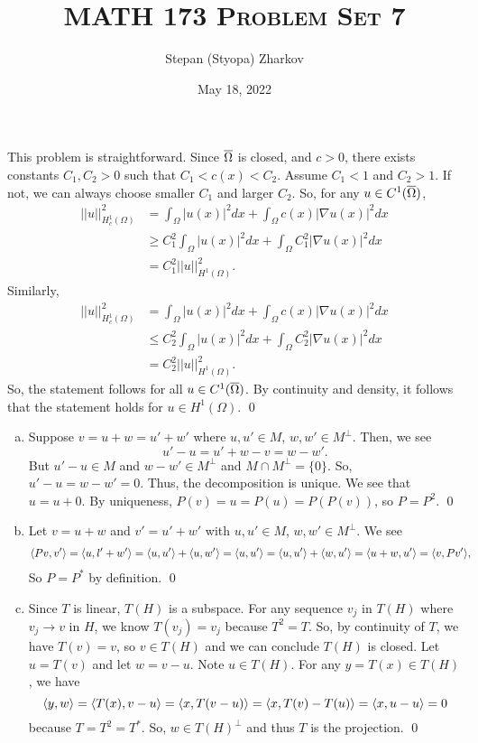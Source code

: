 \documentclass{article}
\title{\textsc{MATH 173 Problem Set 7}}
\author{Stepan (Styopa) Zharkov}
\date{May 18, 2022}
\newcommand{\D}{\nabla}
\begin{document}
\maketitle
{} 
 \tri
\hop 
\solution
This problem is straightforward. Since ${\overline{\Omega}}$ is closed, and $c > 0$, there exists constants $C_1, C_2 >0$ such that $C_1 < c(x) < C_2$. Assume $C_1 < 1$ and $C_2 > 1$. If not, we can always choose smaller $C_1$ and larger $C_2$. So, for any $u \in C^1({\overline{\Omega}})$, 
\begin{align*}
    ||u||^2_{H^1_c(\Omega)} &= \int_\Omega |u(x)|^2 dx + \int_\Omega c(x) |\D u (x)|^2 dx \\
    &\ge C_1^2\int_\Omega |u(x)|^2 dx + \int_\Omega C_1^2|\D u (x)|^2 dx\\
    &= C_1^2||u||^2_{H^1(\Omega)}.
\end{align*}
Similarly, 
\begin{align*}
    ||u||^2_{H^1_c(\Omega)} &= \int_\Omega |u(x)|^2 dx + \int_\Omega c(x) |\D u (x)|^2 dx \\
    &\le C_2^2\int_\Omega |u(x)|^2 dx + \int_\Omega C_2^2|\D u (x)|^2 dx\\
    &= C_2^2||u||^2_{H^1(\Omega)}.
\end{align*}
So, the statement follows for all  $u \in C^1({\overline{\Omega}})$. By continuity and density, it follows that the statement holds for $u \in H^1(\Omega)$. \qed
\newpage
{} 
 \tri
\hop 
\solution
\begin{enumerate}[(a)]
    \item Suppose $v = u+w = u' + w'$ where $u,u' \in M$, $w, w' \in M^\perp$. Then, we see 
    \[u' - u = u'+w - v = w - w'.\]
    But $u'-u \in M$ and $w - w' \in M^\perp$ and $M \cap M^\perp = \{0\}$. So, $u' - u = w-w' = 0$. Thus, the decomposition is unique. 
    \hop 
    We see that $u = u+0$. By uniqueness, $P(v) = u = P(u) = P(P(v))$, so $P = P^2$. \qed
    \item Let $v = u+w$ and $v' = u'+w'$ with $u,u' \in M$, $w, w' \in M^\perp$. We see 
    \begin{align*}
        \langle Pv, v'\rangle  &= \langle u, l'+w'\rangle = \langle u, u'\rangle + \langle u,w'\rangle = \langle u, u'\rangle = \langle u,u'\rangle+\langle w, u'\rangle = \langle u+w, u'\rangle = \langle v, Pv'\rangle,
    \end{align*}
    So $P = P^*$ by definition. \qed 
    \item Since $T$ is linear, $T(H)$ is a subspace. For any sequence $v_j$ in $T(H)$ where $v_j \to v$ in $H$, we know $T(v_j) = v_j$ because $T^2 = T$. So, by continuity of $T$, we have $T(v) = v$, so $v \in T(H)$ and we can conclude $T(H)$ is closed. 
    \hop 
    Let $u = T(v)$ and let $w = v - u$. Note $u \in T(H)$. For any $y = T(x) \in T(H)$, we have 
    \[\langle y, w\rangle = \langle T(x), v- u\rangle = \langle x, T(v-u)\rangle = \langle x, T(v)- T(u)\rangle = \langle x, u- u\rangle = 0\]
    because $T = T^2 = T^*$. So, $w\in T(H)^\perp$ and thus $T$ is the projection. \qed
\end{enumerate}
\end{document}
